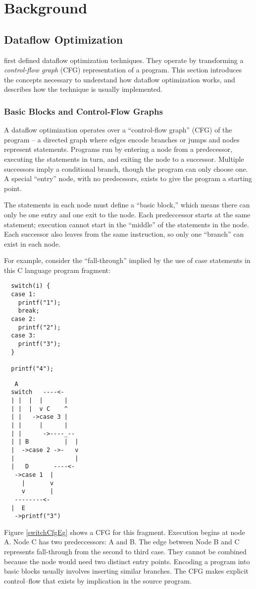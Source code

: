 \documentclass[11pt]{article}
\begin{document}
\section{Background}
\subsection{Dataflow Optimization}

\citet{SoAndSo} first defined dataflow
optimization techniques. They operate by transforming a
\emph{control-flow graph} (CFG) representation of a program. This
section introduces the concepts necessary to understand how dataflow
optimization works, and describes how the technique is usually
implemented.


\subsubsection{Basic Blocks and Control-Flow Graphs}

A dataflow optimization operates over a ``control-flow graph'' (CFG)
of the program -- a directed graph where edges encode branches or
jumps and nodes represent statements. Programs run by entering a node
from a predecessor, executing the statements in turn, and exiting the
node to a successor. Multiple successors imply a conditional branch,
though the program can only choose one. A special ``entry'' node, with
no predecssors, exists to give the program a starting point.

The statements in each node must define a ``basic block,'' which means
there can only be one entry and one exit to the node. Each 
predeccessor starts at the same statement; execution cannot start in
the ``middle'' of the statements in the node. Each successor also
leaves from the same instruction, so only one ``branch'' can exist in
each node.

For example, consider the ``fall-through'' implied by the use of case
statements in this C language program fragment:
\begin{verbatim}
  switch(i) {
  case 1:
    printf("1");
    break;
  case 2:
    printf("2");
  case 3:
    printf("3");
  }

  printf("4");
\end{verbatim}
\begin{verbatim}
   A
  switch   ----<-
  | |  |  |      |
  | |  |  v C    ^
  | |   ->case 3 |
  | |     |      |
  | |      ->----_-- 
  | | B          |  |
  |  ->case 2 ->-   v
  |                 |
  |   D       ----<-
   ->case 1  |
     |       v
     v       |
   --------<-      
  |  E
   ->printf("3")
\end{verbatim}
Figure \ref{switchCfgEg} shows a CFG for this fragment. Execution
begins at node A. Node C has two predeccessors: A and B. The edge
between Node B and C represents fall-through from the second to third
case. They cannot be combined because the node would need two distinct
entry points. Encoding a program into basic blocks usually involves
inserting similar branches. The CFG makes explicit control--flow that
exists by implication in the source program.
\end{document}

